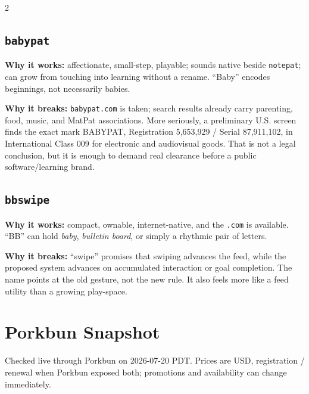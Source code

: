 \documentclass[9pt,letterpaper]{article}
\begin{document}
\begin{multicols}{2}
\subsection{\texttt{babypat}}

\textbf{Why it works:} affectionate, small-step, playable; sounds native beside \texttt{notepat}; can grow from touching into learning without a rename. ``Baby'' encodes beginnings, not necessarily babies.

\textbf{Why it breaks:} \texttt{babypat.com} is taken; search results already carry parenting, food, music, and MatPat associations. More seriously, a preliminary U.S. screen finds the exact mark \textsc{BABYPAT}, Registration 5,653,929 / Serial 87,911,102, in International Class 009 for electronic and audiovisual goods. That is not a legal conclusion, but it is enough to demand real clearance before a public software/learning brand.

\subsection{\texttt{bbswipe}}

\textbf{Why it works:} compact, ownable, internet-native, and the \texttt{.com} is available. ``BB'' can hold \emph{baby}, \emph{bulletin board}, or simply a rhythmic pair of letters.

\textbf{Why it breaks:} ``swipe'' promises that swiping advances the feed, while the proposed system advances on accumulated interaction or goal completion. The name points at the old gesture, not the new rule. It also feels more like a feed utility than a growing play-space.

\section{Porkbun Snapshot}

Checked live through Porkbun on 2026-07-20 PDT. Prices are USD, registration / renewal when Porkbun exposed both; promotions and availability can change immediately.


\end{multicols}
\end{document}
